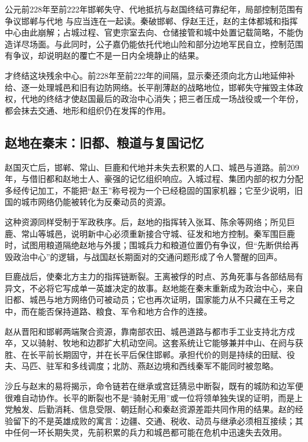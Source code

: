 \begin{event}{公元前228年至前222年}{邯郸失守、代地抵抗与赵国终结}{可靠纪年，局部控制范围有争议}{邯郸与代地}
与应当连在一起读。秦破邯郸、俘赵王迁，赵的主体都城和指挥中心由此崩解；占城过程、官吏宗室去向、仓储接管和城中处置记载简略，不能伪造详尽场面。与此同时，公子嘉仍能依托代地山险和部分边地军民自立，控制范围有争议，却说明赵的覆亡不是一日内全境静止的结果。

才终结这块残余中心。前228年至前222年的间隔，显示秦还须向北方山地延伸补给、逐一处理城邑和旧有边防网络。长平削薄赵的战略地位，邯郸失守摧毁主体政权，代地的终结才使赵国最后的政治中心消失；把三者压成一场战役或一个年份，都会抹去交通、地形和组织仍在发挥的作用。
\end{event}

\subsection{赵地在秦末：旧都、粮道与复国记忆}

赵国灭亡后，邯郸、常山、巨鹿和代地并未失去积累的人口、城邑与道路。前209年，与借旧都和赵地士人、豪强的记忆组织响应。入城过程、集团内部的权力分配多经传记加工，不能把“赵王”称号视为一个已经稳固的国家机器；它至少说明，旧国的城市网络仍能被转化为反秦动员的资源。

这种资源同样受制于军政秩序。后，赵地的指挥转入张耳、陈余等网络；所见巨鹿、常山等城邑，说明新中心必须重新接合守城、征发和地方控制。秦军围巨鹿时，试图用粮道隔绝赵地与外援；围城兵力和粮道位置仍有争议，但“先断供给再毁政治中心”的逻辑，与战国赵长期面对的交通问题形成了令人警醒的回声。

巨鹿战后，使秦北方主力的指挥链断裂。王离被俘的时点、苏角死事与各部结局有异文，不必将它写成单一英雄决定的故事。赵地能在秦末重新成为政治中心，来自旧都、城邑与地方网络仍可被动员；它也再次证明，国家能力从不只藏在王号之中，而在能否保持道路、粮食、军令和地方合作的连接。

\begin{turningpoint}
赵从晋阳和邯郸两端聚合资源，靠南部农田、城邑道路与都市手工业支持北方戍卒，又以骑射、牧地和边郡扩大机动空间。这套系统让它能够兼并中山、在阏与获胜、在长平前长期固守，并在长平后保住邯郸。承担代价的则是持续的田赋、役夫、马匹、驻军和多线调度；北防、燕赵边境和西线秦军不能同时被忽略。

沙丘与赵末的易将揭示，命令链若在继承或宫廷猜忌中断裂，既有的城防和边军便很难自动协作。长平的断裂也不是“骑射无用”或一位将领单独失误的证明，而是上党触发、后勤消耗、信息受限、朝廷耐心和秦赵资源差距共同作用的结果。赵的经验留下的不是英雄成败的寓言：边疆、交通、税收、动员与继承必须相互接续；其中任何一环长期失灵，先前积累的兵力和城邑都可能在危机中迅速失去效用。
\end{turningpoint}
